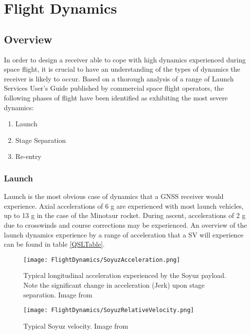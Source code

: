 \label{ch:FlightDynamics}
\chapter{Flight Dynamics}

\section{Overview}
In order to design a receiver able to cope with high dynamics experienced during space flight, it is crucial to have an understanding of the types of dynamics the receiver is likely to occur. Based on a thorough analysis of a range of Launch Services User's Guide published by commercial space flight operators, the following phases of flight have been identified as exhibiting the most severe dynamics: 

\begin{enumerate}
\item{Launch}
\item{Stage Separation}
\item{Re-entry}
\end{enumerate}

\subsection{Launch}
Launch is the most obvious case of dynamics that a \ac{GNSS} receiver would experience. Axial accelerations of 6 g are experienced with most launch vehicles, up to 13 g in the case of the Minotaur rocket. During ascent, accelerations of 2 g due to crosswinds and course corrections may be experienced. An overview of the launch dynamics experience by a range of acceleration that a \ac{SV} will experience can be found in table \ref{QSLTable}.

\begin{figure}[!htb] 
    \centering
    \texttt{[image: FlightDynamics/SoyuzAcceleration.png]} 
    \caption{Typical longitudinal acceleration experienced by the Soyuz payload. Note the significant change in acceleration (Jerk) upon stage separation. Image from \cite{Soyuz}}
    \label{fig:SoyuzAcceleration}
\end{figure}

\begin{figure}[!htb] 
    \centering
    \texttt{[image: FlightDynamics/SoyuzRelativeVelocity.png]} 
    \caption{Typical Soyuz velocity. Image from \cite{Soyuz}}
    \label{fig:SoyuzRelativeVelocity}
\end{figure}



